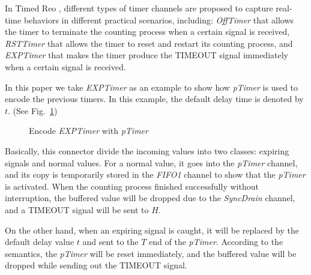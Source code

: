 %     

\begin{example}
    \label{exp:exptimer}
    
    In Timed Reo \cite{Meng2012}, different types of timer channels are proposed to capture real-time behaviors in different practical scenarios, including: \emph{OffTimer} that allows the timer to terminate the counting process when a certain signal is received, \emph{RSTTimer} that allows the timer to reset and restart its counting process, and \emph{EXPTimer} that makes the timer produce the TIMEOUT signal immediately when a certain signal is received.

    
    In this paper we take \emph{EXPTimer} as an example to show how \emph{pTimer} is used to encode the previous timers. In this example, the default delay time is denoted by $t$. (See Fig.~\ref{fig:exptimer})
    \begin{figure}
        \centering
        \resizebox{0.6\textwidth}{!}{
            
        }
        \caption{Encode \emph{EXPTimer} with \emph{pTimer}}
        \label{fig:exptimer}
    \end{figure}
    
    Basically, this connector divide the incoming values into two classes: expiring signals and normal values. For a normal value, it goes into the \emph{pTimer} channel, and its copy is temporarily stored in the \emph{FIFO1} channel to show that the \emph{pTimer} is activated. When the counting process finished successfully without interruption, the buffered value will be dropped due to the \emph{SyncDrain} channel, and a TIMEOUT signal will be sent to $H$.

    On the other hand, when an expiring signal is caught, it will be replaced by the default delay value $t$ and sent to the $T$ end of the \emph{pTimer}. According to the semantics, the \emph{pTimer} will be reset immediately, and the buffered value will be dropped while sending out the TIMEOUT signal.
    
\end{example}
